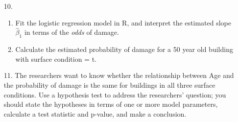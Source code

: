 \documentclass[11pt]{article}
\begin{document}
\begin{enumerate}
\item[10.] 
\begin{enumerate}
\item Fit the logistic regression model in R, and interpret the estimated slope $\widehat{\beta}_1$ in terms of the \textit{odds} of damage.

\item Calculate the estimated probability of damage for a 50 year old building with surface condition = t.
\end{enumerate}

\item[11.] The researchers want to know whether the relationship between Age and the probability of damage is the same for buildings in all three surface conditions. Use a hypothesis test to address the researchers' question; you should state the hypotheses in terms of one or more model parameters, calculate a test statistic and p-value, and make a conclusion.

\end{enumerate}
\end{document}
